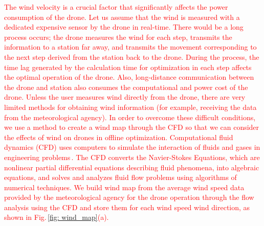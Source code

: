 \documentclass[journal]{./template/IEEEtran}
\begin{document}
\textcolor{red}{
The wind velocity is a crucial factor that significantly affects the power consumption of the drone. Let us assume that the wind is measured with a dedicated expensive sensor by the drone in real-time. There would be a long process occurs; 
the drone measures the wind for each step, transmits the information to a station far away, and transmits the movement corresponding to the next step derived from the station back to the drone.
During the process, the time lag generated by the calculation time for optimization in each step affects the optimal operation of the drone. 
Also, long-distance communication between the drone and station also consumes the computational and power cost of the drone.
Unless the user measures wind directly from the drone, there are very limited methods for obtaining wind information (for example, receiving the data from the meteorological agency).
In order to overcome these difficult conditions, we use a method to create a wind map through the CFD so that we can consider the effects of wind on drones in offline optimization.
Computational fluid dynamics (CFD) uses computers to simulate the interaction of fluids and gases in engineering problems\,\cite{ref_26}. 
The CFD converts the Navier-Stokes Equations, which are nonlinear partial differential equations describing fluid phenomena, into algebraic equations, and solves and analyzes fluid flow problems using algorithms of numerical techniques.
We build wind map from the average wind speed data provided by the meteorological agency for the drone operation through the flow analysis using the CFD and store them for each wind speed wind direction, as shown in Fig.\,\ref{fig: wind_map}(a).}
\end{document}
